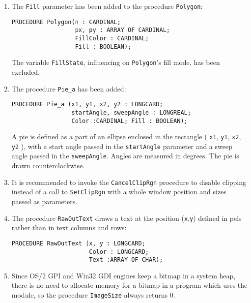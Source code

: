 \begin{enumerate}
      {\bf Note:} By "number of text columns" ("text rows") a maximum number
                  of monospaced font characters which can be placed into the {\bf Graph}
                  window in one column (row) is meant.

\item The \verb'Fill' parameter has been added to the procedure \verb'Polygon':

\begin{verbatim}
PROCEDURE Polygon(n : CARDINAL;
                  px, py : ARRAY OF CARDINAL;
                  FillColor : CARDINAL;
                  Fill : BOOLEAN);
\end{verbatim}

      The variable \verb'FillState', influencing on \verb'Polygon''s
      fill mode, has been excluded.

\item The procedure \verb'Pie_a' has been added:

\begin{verbatim}
PROCEDURE Pie_a (x1, y1, x2, y2 : LONGCARD;
                 startAngle, sweepAngle : LONGREAL;
                 Color :CARDINAL; Fill : BOOLEAN);
\end{verbatim}

        A pie is defined as a part of an ellipse enclosed in the rectangle
        ( \verb'x1', \verb'y1', \verb'x2', \verb'y2' ), with a start angle
        passed in the \verb'startAngle' parameter and a sweep angle passed
        in the \verb'sweepAngle'. Angles are measured in degrees. The pie
        is drawn counterclockwise.

\item It is recommended to invoke the \verb'CancelClipRgn' procedure to disable
      clipping instead of a call to \verb'SetClipRgn' with a whole window position
      and sizes passed as parameters.

\item The procedure \verb'RawOutText' draws a text at the position (\verb'x',\verb'y')
      defined in pels rather than in text columns and rows:

\begin{verbatim}
PROCEDURE RawOutText (x, y : LONGCARD;
                      Color : LONGCARD;
                      Text :ARRAY OF CHAR);
\end{verbatim}

\item Since OS/2 GPI and Win32 GDI engines keep a bitmap in a system heap,
      there is no need to allocate memory for a bitmap in a program which
      uses the module, so the procedure \verb'ImageSize' always returns 0.


\end{enumerate}
